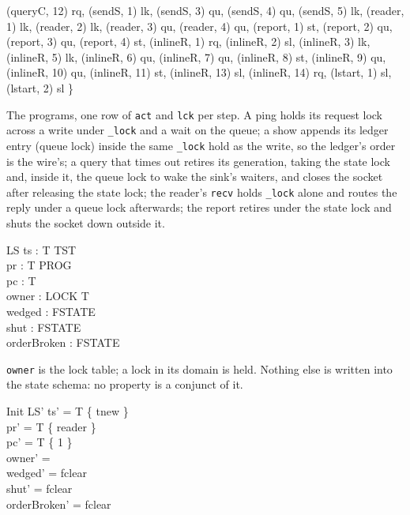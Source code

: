 \documentclass[a4paper,10pt,fleqn]{article}
\begin{document}
\begin{axdef}
    (queryC, 12) \mapsto rq,
    (sendS, 1) \mapsto lk, (sendS, 3) \mapsto qu, (sendS, 4) \mapsto qu,
    (sendS, 5) \mapsto lk,
    (reader, 1) \mapsto lk, (reader, 2) \mapsto lk, (reader, 3) \mapsto qu,
    (reader, 4) \mapsto qu,
    (report, 1) \mapsto st, (report, 2) \mapsto qu, (report, 3) \mapsto qu,
    (report, 4) \mapsto st,
    (inlineR, 1) \mapsto rq, (inlineR, 2) \mapsto sl, (inlineR, 3) \mapsto lk,
    (inlineR, 5) \mapsto lk, (inlineR, 6) \mapsto qu, (inlineR, 7) \mapsto qu,
    (inlineR, 8) \mapsto st, (inlineR, 9) \mapsto qu, (inlineR, 10) \mapsto qu,
    (inlineR, 11) \mapsto st, (inlineR, 13) \mapsto sl, (inlineR, 14) \mapsto rq,
    (lstart, 1) \mapsto sl, (lstart, 2) \mapsto sl \}
\end{axdef}

The programs, one row of \texttt{act} and \texttt{lck} per step.  A ping holds
its request lock across a write under \texttt{\_lock} and a wait on the queue;
a show appends its ledger entry (queue lock) inside the same \texttt{\_lock}
hold as the write, so the ledger's order is the wire's; a query that times out
retires its generation, taking the state lock and, inside it, the queue lock
to wake the sink's waiters, and closes the socket after releasing the state
lock; the reader's \texttt{recv} holds \texttt{\_lock} alone and routes the
reply under a queue lock afterwards; the report retires under the state lock
and shuts the socket down outside it.

\begin{schema}{LS}
  ts : T \fun TST \\
  pr : T \fun PROG \\
  pc : T   \\
  owner : LOCK \pfun T \\
  wedged : FSTATE \\
  shut : FSTATE \\
  orderBroken : FSTATE
\end{schema}

\texttt{owner} is the lock table; a lock in its domain is held.  Nothing else
is written into the state schema: no property is a conjunct of it.

\begin{schema}{Init}
  LS'
\where
  ts' = T \cross \{ tnew \} \\
  pr' = T \cross \{ reader \} \\
  pc' = T \cross \{ 1 \} \\
  owner' = \emptyset \\
  wedged' = fclear \\
  shut' = fclear \\
  orderBroken' = fclear
\end{schema}
\end{document}
